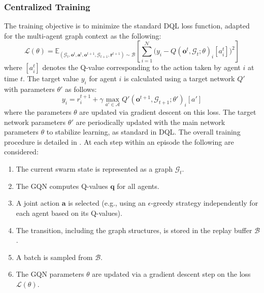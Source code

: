 \subsubsection{Centralized Training}
The training objective is to minimize the standard DQL loss function, 
 adapted for the multi-agent graph context as the following: 
\begin{equation}
\mathcal{L}(\theta) =
\mathbb{E}_{(\mathcal{G}_t,\mathbf{o}^t,\mathbf{a}^t, \mathbf{o}^{t+1}, \mathcal{G}_{t+1}, \mathbf{r}^{t+1})\sim\mathcal{B}}
\left[\sum_{i=1}^{\mathcal{N}}\bigl(y_i - Q(\mathbf{o}^t,\mathcal{G}_t;\theta)_i[a_i^t]\bigr)^2\right]
\end{equation}
where $[a_i^t]$ denotes the Q-value corresponding to the action taken by agent $i$ at time $t$.
%
The target value \(y_i\) for agent \(i\) 
 is calculated using a target network \(Q'\) with parameters \(\theta'\) as follows:
{\begin{equation}
y_i = r_i^{t+1} + \gamma \max_{a' \in \mathcal{A}} Q'(\mathbf{o}^{t+1},\mathcal{G}_{t+1}; \theta')_i[a']
\end{equation}}
%
where the parameters \(\theta\) 
 are updated via gradient descent on this loss. 
 The target network parameters \(\theta'\) 
 are periodically updated with the main network parameters \(\theta\) 
 to stabilize learning, as standard in DQL.
%
The overall training procedure is detailed in . 
%
At each step within an episode the following are considered:
\begin{enumerate}[label=(\roman*),leftmargin=*,labelsep=0mm]
    \item[\mycircled{1}] The current swarm state is represented as a graph \(\mathcal{G}_t\).
    \item[\mycircled{2}] The GQN computes Q-values \(\mathbf{q}\) for all agents.
    \item[\mycircled{3}] A joint action \(\mathbf{a}\) is selected 
    (e.g., using an \(\epsilon\)-greedy strategy independently for each agent based on its Q-values).
    \item[\mycircled{4}] The transition, including the graph structures, is stored in the replay buffer \(\mathcal{B}\).
    \item[\mycircled{5}] A batch is sampled from \(\mathcal{B}\).
    \item[\mycircled{6}] The GQN parameters \(\theta\) are updated via a gradient descent step on the loss \(\mathcal{L}(\theta)\).
\end{enumerate}


